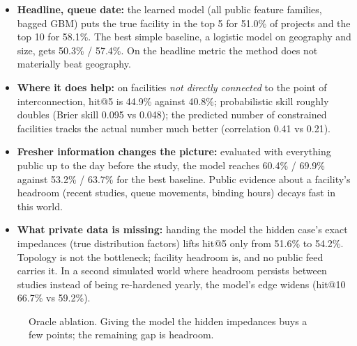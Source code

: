 \documentclass[11pt,a4paper]{article}
\begin{document}
\begin{itemize}
\item \textbf{Headline, queue date:} the learned model (all public feature families, bagged GBM) puts the true facility in
  the top 5 for 51.0\% of projects and the top 10 for 58.1\%. The best simple baseline, a logistic model on geography and
  size, gets 50.3\% / 57.4\%. On the headline metric the method does not materially beat geography.
\item \textbf{Where it does help:} on facilities \emph{not directly connected} to the point of interconnection, hit@5 is
  44.9\% against 40.8\%; probabilistic skill roughly doubles (Brier skill 0.095 vs 0.048); the predicted number of
  constrained facilities tracks the actual number much better (correlation 0.41 vs 0.21).
\item \textbf{Fresher information changes the picture:} evaluated with everything public up to the day before the study,
  the model reaches 60.4\% / 69.9\% against 53.2\% / 63.7\% for the best baseline. Public evidence about a facility's
  headroom (recent studies, queue movements, binding hours) decays fast in this world.
\item \textbf{What private data is missing:} handing the model the hidden case's exact impedances (true distribution
  factors) lifts hit@5 only from 51.6\% to 54.2\%. Topology is not the bottleneck; facility headroom is, and no public
  feed carries it. In a second simulated world where headroom persists between studies instead of being re-hardened
  yearly, the model's edge widens (hit@10 66.7\% vs 59.2\%).
\end{itemize}

\begin{figure}[h]
\centering
{}
\caption{Oracle ablation. Giving the model the hidden impedances buys a few points; the remaining gap is headroom.}
\end{figure}
\end{document}
